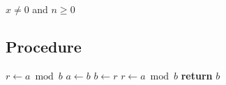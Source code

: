 \documentclass{amsart}
\begin{document}
\begin{algorithmic}[1]
    \Ensure $x \neq 0$ and $n \geq 0$
\end{algorithmic}

% 

% 

% 

% 

\subsection{Procedure}


\begin{algorithmic}[1]
    \State $r\gets a\bmod b$
        \State $a\gets b$
        \State $b\gets r$
        \State $r\gets a\bmod b$
    \EndWhile\label{euclidendwhile}
    \State \textbf{return} $b$
\EndProcedure
\end{algorithmic}
\end{document}
